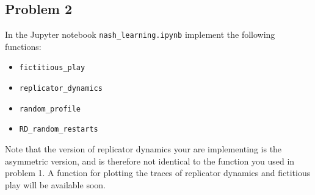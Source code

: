 \documentclass[11pt]{article}
\begin{document}
\subsection*{Problem 2}

In the Jupyter notebook \texttt{nash\_learning.ipynb} implement the following functions:

\begin{itemize}
\item \texttt{fictitious\_play}
\item \texttt{replicator\_dynamics}
\item \texttt{random\_profile}
\item \texttt{RD\_random\_restarts}
\end{itemize}

Note that the version of replicator dynamics your are implementing is the asymmetric version, and is therefore not identical to the function you used in problem 1.
A function for plotting the traces of replicator dynamics and fictitious play will be available soon.
\end{document}
